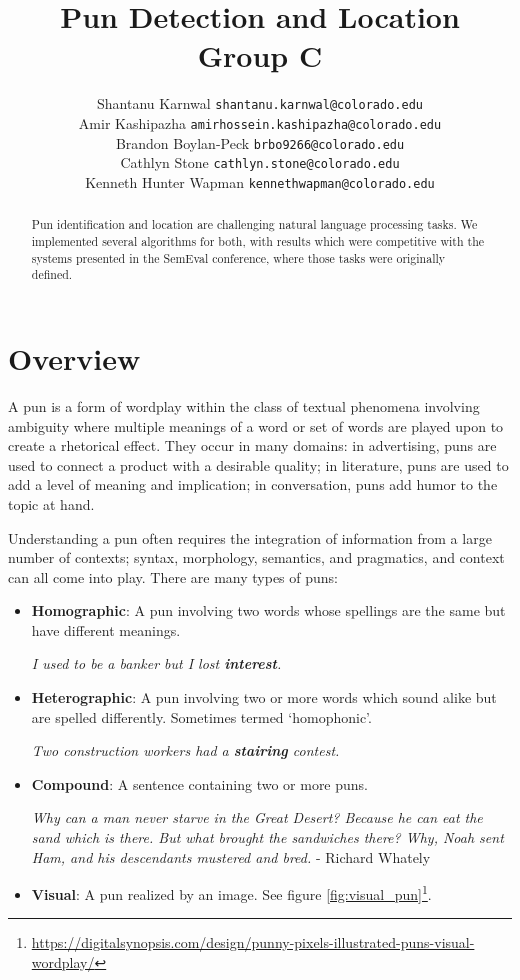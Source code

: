 \documentclass{article}
\title{Pun Detection and Location\\Group C}
\author{
   Shantanu Karnwal \texttt{shantanu.karnwal@colorado.edu} \\
   \And Amir Kashipazha \texttt{amirhossein.kashipazha@colorado.edu} \\
   \And Brandon Boylan-Peck \texttt{brbo9266@colorado.edu} \\
   \And Cathlyn Stone \texttt{cathlyn.stone@colorado.edu} \\
   \And Kenneth Hunter Wapman \texttt{kennethwapman@colorado.edu} \\
}
\begin{document}
\maketitle

\begin{abstract}
	Pun identification and location are challenging natural language processing 
	tasks. We implemented several algorithms for both, with results which 
	were competitive with the systems presented in the SemEval conference, where
	those tasks were originally defined.
\end{abstract}


\section{Overview}
A pun is a form of wordplay within the class of textual phenomena involving
ambiguity where multiple meanings of a word or set of words are played upon to
create a rhetorical effect. They occur in many domains: in advertising, puns
are used to connect a product with a desirable quality; in literature, puns are
used to add a level of meaning and implication; in conversation, puns add humor
to the topic at hand.

Understanding a pun often requires the integration of information from a large
number of contexts; syntax, morphology, semantics, and pragmatics, and context
can all come into play. There are many types of puns:

\begin{itemize}
	\item{\textbf{Homographic}: A pun involving two words whose spellings are
		the same but have different meanings.
		\begin{center}
		\emph{I used to be a banker but I lost \textbf{interest}.}
		\end{center}
	}
	\item{\textbf{Heterographic}: A pun involving two or more words which sound
		alike but are spelled differently. Sometimes termed `homophonic'.
		\begin{center}
		\emph{Two construction workers had a \textbf{stairing} contest.}
		\end{center}
	}
	\item{\textbf{Compound}: A sentence containing two or more puns.
		\begin{center}
		\emph{Why can a man never starve in the Great Desert? Because he can
		eat the sand which is there. But what brought the sandwiches there?
		Why, Noah sent Ham, and his descendants mustered and bred.} - Richard Whately
		\end{center}
	}
	\item{\textbf{Visual}: A pun realized by an image. See figure \ref{fig:visual_pun}\footnote{\url{https://digitalsynopsis.com/design/punny-pixels-illustrated-puns-visual-wordplay/}}.
	}
\end{itemize}
\end{document}
